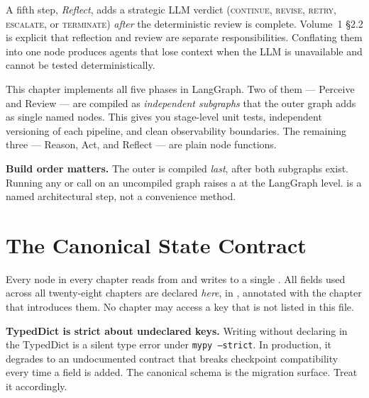 A fifth step, \emph{Reflect}, adds a strategic LLM verdict
(\textsc{continue}, \textsc{revise}, \textsc{retry}, \textsc{escalate},
or \textsc{terminate}) \emph{after} the deterministic review is
complete.  Volume~1 §2.2 is explicit that reflection and review are
separate responsibilities.  Conflating them into one node produces
agents that lose context when the LLM is unavailable and cannot be
tested deterministically.

\medskip
\noindent
This chapter implements all five phases in LangGraph.  Two of them
--- Perceive and Review --- are compiled as \emph{independent subgraphs}
that the outer graph adds as single named nodes.  This gives you
stage-level unit tests, independent versioning of each pipeline, and
clean observability boundaries.  The remaining three --- Reason, Act, and
Reflect --- are plain node functions.

\begin{notebox}
\textbf{Build order matters.}  The outer  is compiled
\emph{last}, after both subgraphs exist.  Running any 
or  call on an uncompiled graph raises a
 at the LangGraph level.   is a
named architectural step, not a convenience method.
\end{notebox}

\section{The Canonical State Contract}
\label{sec:state-contract}

Every node in every chapter reads from and writes to a single
 .  All fields used across all
twenty-eight chapters are declared \emph{here}, in ,
annotated with the chapter that introduces them.  No chapter may access a
key that is not listed in this file.

\begin{warningbox}
\textbf{TypedDict is strict about undeclared keys.}  Writing
 without declaring 
in the TypedDict is a silent type error under \texttt{mypy --strict}.
In production, it degrades to an undocumented contract that breaks
checkpoint compatibility every time a field is added.  The canonical
schema is the migration surface.  Treat it accordingly.
\end{warningbox}

